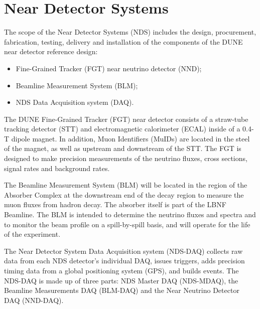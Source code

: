 \section{Near Detector Systems}
\label{sec:detectors-nd-ref-ov}

The scope of the Near Detector Systems (NDS) includes the design, procurement, fabrication, testing, delivery and installation of the components of the DUNE near detector reference design: 

\begin{itemize}
\item Fine-Grained Tracker (FGT) near neutrino detector (NND);
\item Beamline Measurement System (BLM);  
\item NDS Data Acquisition system (DAQ).  
\end{itemize}

The DUNE Fine-Grained Tracker (FGT) near detector consists of a straw-tube
tracking detector (STT) and electromagnetic calorimeter (ECAL) inside of a 0.4-T
dipole magnet. In addition, Muon Identifiers (MuIDs) are located in the
steel of the magnet, as well as upstream and downstream of the STT. The FGT
is designed to make precision measurements of the neutrino fluxes, 
cross sections, signal rates and background rates. 

The Beamline Measurement System (BLM) will be located in the region of the Absorber Complex at 
the downstream end of the decay region to measure the muon fluxes from hadron decay. The 
absorber itself is part of the LBNF Beamline. 
The BLM is intended to determine the neutrino fluxes and spectra
and to monitor the beam profile on a spill-by-spill basis, and will operate for the life of the
experiment. 

The Near Detector System Data Acquisition system (NDS-DAQ) collects raw data from each NDS detector's
individual DAQ, issues triggers, adds precision timing 
data from a global positioning system (GPS), and builds events. 
The NDS-DAQ is made up of three parts: NDS Master DAQ (NDS-MDAQ), the Beamline Measurements 
DAQ (BLM-DAQ) and the Near Neutrino Detector DAQ (NND-DAQ).





